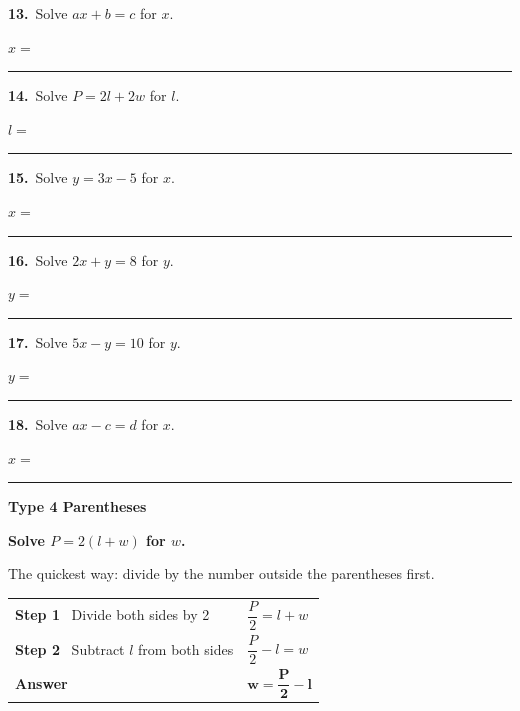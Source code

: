 \documentclass[11pt,letterpaper]{article}
\newcommand{\topicbar}[1]{\needspace{4.5cm}\par\vspace{5mm}
  \begin{tcolorbox}[enhanced,colback=fmtitle,colframe=fmtitle,arc=2mm,left=4mm,top=1.5mm,bottom=1.5mm]
  \color{white}\bfseries\large #1
  \end{tcolorbox}}
\begin{document}
\needspace{3.5cm}\par\vspace{3mm}\noindent \begin{minipage}[t][3.0cm]{0.48\linewidth}\raggedright{\color{fmturn}\bfseries 13.}\ Solve $ax + b = c$ for $x$.\par\vfill\hfill $x = $\ \rule{3.2cm}{0.4pt}\end{minipage}\hfill \begin{minipage}[t][3.0cm]{0.48\linewidth}\raggedright{\color{fmturn}\bfseries 14.}\ Solve $P = 2l + 2w$ for $l$.\par\vfill\hfill $l = $\ \rule{3.2cm}{0.4pt}\end{minipage}\par
\needspace{3.5cm}\par\vspace{3mm}\noindent \begin{minipage}[t][3.0cm]{0.48\linewidth}\raggedright{\color{fmturn}\bfseries 15.}\ Solve $y = 3x - 5$ for $x$.\par\vfill\hfill $x = $\ \rule{3.2cm}{0.4pt}\end{minipage}\hfill \begin{minipage}[t][3.0cm]{0.48\linewidth}\raggedright{\color{fmturn}\bfseries 16.}\ Solve $2x + y = 8$ for $y$.\par\vfill\hfill $y = $\ \rule{3.2cm}{0.4pt}\end{minipage}\par
\needspace{3.5cm}\par\vspace{3mm}\noindent \begin{minipage}[t][3.0cm]{0.48\linewidth}\raggedright{\color{fmturn}\bfseries 17.}\ Solve $5x - y = 10$ for $y$.\par\vfill\hfill $y = $\ \rule{3.2cm}{0.4pt}\end{minipage}\hfill \begin{minipage}[t][3.0cm]{0.48\linewidth}\raggedright{\color{fmturn}\bfseries 18.}\ Solve $ax - c = d$ for $x$.\par\vfill\hfill $x = $\ \rule{3.2cm}{0.4pt}\end{minipage}\par
\needspace{9cm}\topicbar{Type 4 \quad Parentheses}
\begin{watchme}\textbf{Solve $P = 2(l + w)$ for $w$.}\par\vspace{1mm}
The quickest way: divide by the number outside the parentheses first.\par\vspace{1mm}
\renewcommand{\arraystretch}{2.1}\begin{tabular}{@{}l l@{}}
\textbf{Step 1} \ Divide both sides by 2 & $\dfrac{P}{2} = l + w$\\
\textbf{Step 2} \ Subtract $l$ from both sides & $\dfrac{P}{2} - l = w$\\
\textbf{Answer} & $\boldsymbol{w = \dfrac{P}{2} - l}$
\end{tabular}\end{watchme}
\end{document}
